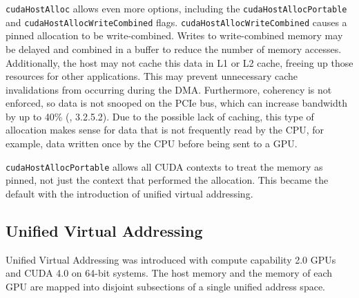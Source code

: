 \begin{sloppypar}
\texttt{cudaHostAlloc} allows even more options, including the \texttt{cudaHostAllocPortable} and \texttt{cudaHostAllocWriteCombined} flags.
\texttt{cudaHostAllocWriteCombined} causes a pinned allocation to be write-combined.
Writes to write-combined memory may be delayed and combined in a buffer to reduce the number of memory accesses.
Additionally, the host may not cache this data in L1 or L2 cache, freeing up those resources for other applications.
This may prevent unnecessary cache invalidations from occurring during the DMA.
Furthermore, coherency is not enforced, so data is not snooped on the PCIe bus, which can increase bandwidth by up to 40\% (\cite{nvidia2010cuda30}, 3.2.5.2).
Due to the possible lack of caching, this type of allocation makes sense for data that is not frequently read by the CPU, for example, data written once by the CPU before being sent to a GPU.
\end{sloppypar}


\texttt{cudaHostAllocPortable} allows all CUDA contexts to treat the memory as pinned, not just the context that performed the allocation.
This became the default with the introduction of unified virtual addressing.

\subsection{Unified Virtual Addressing}
\label{sec:uva}

Unified Virtual Addressing was introduced with compute capability 2.0 GPUs and CUDA 4.0 on 64-bit systems.
The host memory and the memory of each GPU are mapped into disjoint subsections of a single unified address space.

